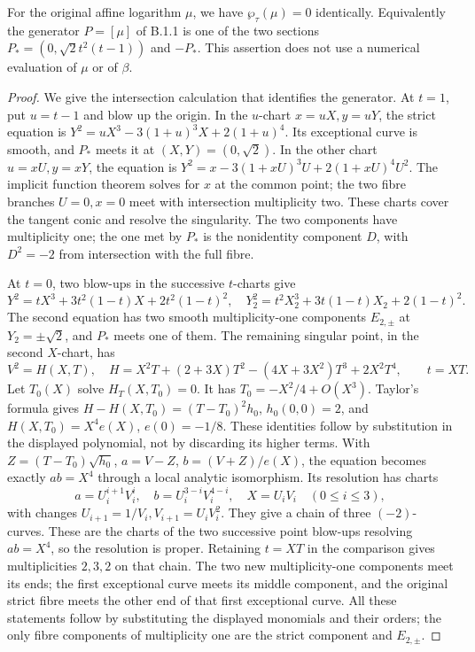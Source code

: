 \begin{proposition}[B.1.3; Proved]\label{st:B.1.3}
For the original affine logarithm $\mu$, we have $\wp_\tau(\mu)=0$ identically. Equivalently the generator $P=[\mu]$ of B.1.1 is one of the two sections $P_*=(0,\sqrt2t^2(t-1))$ and $-P_*$. This assertion does not use a numerical evaluation of $\mu$ or of $\beta$.
\end{proposition}
\begin{proof}
We give the intersection calculation that identifies the generator. At $t=1$, put $u=t-1$ and blow up the origin. In the $u$-chart $x=uX,y=uY$, the strict equation is
$Y^2=uX^3-3(1+u)^3X+2(1+u)^4$. Its exceptional curve is smooth, and $P_*$ meets it at $(X,Y)=(0,\sqrt2)$. In the other chart $u=xU,y=xY$, the equation is $Y^2=x-3(1+xU)^3U+2(1+xU)^4U^2$. The implicit function theorem solves for $x$ at the common point; the two fibre branches $U=0,x=0$ meet with intersection multiplicity two. These charts cover the tangent conic and resolve the singularity. The two components have multiplicity one; the one met by $P_*$ is the nonidentity component $D$, with $D^2=-2$ from intersection with the full fibre.

At $t=0$, two blow-ups in the successive $t$-charts give
\[
 Y^2=tX^3+3t^2(1-t)X+2t^2(1-t)^2,
\quad
 Y_2^2=t^2X_2^3+3t(1-t)X_2+2(1-t)^2.
\]
The second equation has two smooth multiplicity-one components $E_{2,\pm}$ at $Y_2=\pm\sqrt2$, and $P_*$ meets one of them. The remaining singular point, in the second $X$-chart, has
\[
 V^2=H(X,T),\quad H=X^2T+(2+3X)T^2-(4X+3X^2)T^3+2X^2T^4,
 \qquad t=XT.
\]
Let $T_0(X)$ solve $H_T(X,T_0)=0$. It has $T_0=-X^2/4+O(X^3)$. Taylor's formula gives
$H-H(X,T_0)=(T-T_0)^2h_0$, $h_0(0,0)=2$, and $H(X,T_0)=X^4e(X)$, $e(0)=-1/8$. These identities follow by substitution in the displayed polynomial, not by discarding its higher terms. With $Z=(T-T_0)\sqrt{h_0}$, $a=V-Z$, $b=(V+Z)/e(X)$, the equation becomes exactly $ab=X^4$ through a local analytic isomorphism. Its resolution has charts
\[
 a=U_i^{i+1}V_i^i,\quad b=U_i^{3-i}V_i^{4-i},\quad X=U_iV_i
 \quad(0\le i\le3),
\]
with changes $U_{i+1}=1/V_i,V_{i+1}=U_iV_i^2$. They give a chain of three $(-2)$-curves. These are the charts of the two successive point blow-ups resolving $ab=X^4$, so the resolution is proper. Retaining $t=XT$ in the comparison gives multiplicities $2,3,2$ on that chain. The two new multiplicity-one components meet its ends; the first exceptional curve meets its middle component, and the original strict fibre meets the other end of that first exceptional curve. All these statements follow by substituting the displayed monomials and their orders; the only fibre components of multiplicity one are the strict component and $E_{2,\pm}$.


\end{proof}

